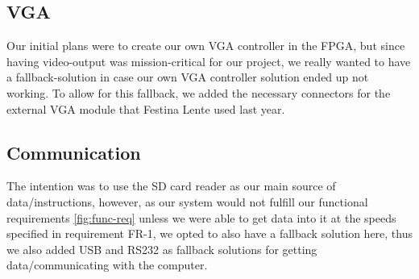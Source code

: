\subsection{VGA}
Our initial plans were to create our own \ac{VGA} controller in the \ac{FPGA}, but since having video-output was mission-critical
for our project, we really wanted to have a fallback-solution in case our own
\ac{VGA} controller solution ended up not working.
To allow for this fallback, we added the necessary connectors for the external \ac{VGA} module that Festina Lente used last year.

\subsection {Communication}
The intention was to use the \ac{SD} card reader as our main source of data/instructions, however, as our system would
not fulfill our functional requirements \ref{fig:func-req}  unless we were able to get data into it at the speeds specified in requirement
FR-1, we opted to also have a fallback
solution here, thus we also added \ac{USB} and RS232 as fallback solutions for getting data/communicating with the
computer.
